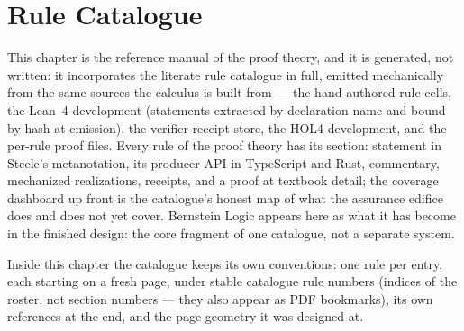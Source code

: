 \chapter{Rule Catalogue}
\label{ch:qtsl-manual}

This chapter is the reference manual of the proof theory, and it is
generated, not written: it incorporates the literate rule catalogue in
full, emitted mechanically from the same sources the calculus is built
from --- the hand-authored rule cells, the Lean~4 development
(statements extracted by declaration name and bound by hash at
emission), the verifier-receipt store, the HOL4 development,
and the per-rule proof files. Every rule of the proof theory has its
section: statement in Steele's metanotation, its producer API in
TypeScript and Rust, commentary, mechanized realizations, receipts,
and a proof at textbook detail; the coverage dashboard up front is the
catalogue's honest map of what the assurance edifice does and does not
yet cover. Bernstein Logic appears here as what it has become in the
finished design: the core fragment of one catalogue, not a separate
system.

Inside this chapter the catalogue keeps its own conventions: one rule
per entry, each starting on a fresh page, under stable catalogue rule
numbers (indices of the roster,
not section numbers --- they also appear as PDF bookmarks), its own
references at the end, and the page geometry it was designed at.


\restoregeometry
